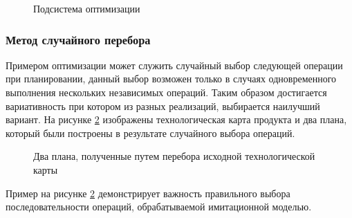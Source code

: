 \begin{figure}[H]
    \caption{Подсистема оптимизации}
    \label{ris:optimization}
\end{figure}


\subsubsection*{Метод случайного перебора}
Примером оптимизации может служить случайный выбор следующей операции при планировании, данный выбор возможен только в случаях одновременного выполнения нескольких независимых операций. Таким образом достигается вариативность при котором из разных реализаций, выбирается наилучший вариант. На рисунке \ref{ris:Force} изображены технологическая карта продукта и два плана, который были построены в результате случайного выбора операций.

\begin{figure}[H]
    \caption{Два плана, полученные путем перебора исходной технологической карты}
    \label{ris:Force}
\end{figure}

Пример на рисунке \ref{ris:Force} демонстрирует важность правильного выбора последовательности операций, обрабатываемой имитационной моделью. 

